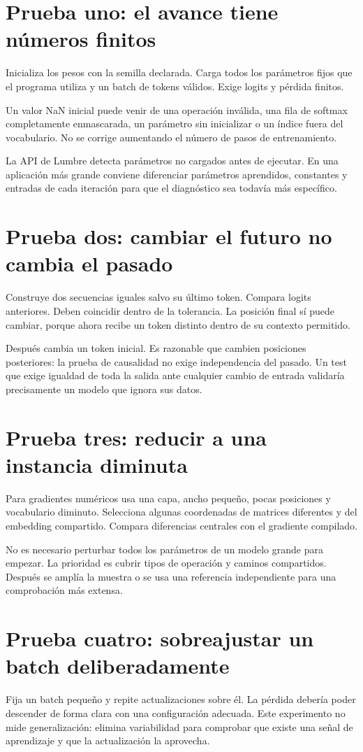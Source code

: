 \documentclass[12pt,a4paper,oneside]{report}
\begin{document}
\section{Prueba uno: el avance tiene números finitos}
Inicializa los pesos con la semilla declarada. Carga todos los parámetros fijos que el programa utiliza y un batch de tokens válidos. Exige logits y pérdida finitos.

Un valor NaN inicial puede venir de una operación inválida, una fila de softmax completamente enmascarada, un parámetro sin inicializar o un índice fuera del vocabulario. No se corrige aumentando el número de pasos de entrenamiento.

La API de Lumbre detecta parámetros no cargados antes de ejecutar. En una aplicación más grande conviene diferenciar parámetros aprendidos, constantes y entradas de cada iteración para que el diagnóstico sea todavía más específico.

\section{Prueba dos: cambiar el futuro no cambia el pasado}
Construye dos secuencias iguales salvo su último token. Compara logits anteriores. Deben coincidir dentro de la tolerancia. La posición final sí puede cambiar, porque ahora recibe un token distinto dentro de su contexto permitido.

Después cambia un token inicial. Es razonable que cambien posiciones posteriores: la prueba de causalidad no exige independencia del pasado. Un test que exige igualdad de toda la salida ante cualquier cambio de entrada validaría precisamente un modelo que ignora sus datos.

\section{Prueba tres: reducir a una instancia diminuta}
Para gradientes numéricos usa una capa, ancho pequeño, pocas posiciones y vocabulario diminuto. Selecciona algunas coordenadas de matrices diferentes y del embedding compartido. Compara diferencias centrales con el gradiente compilado.

No es necesario perturbar todos los parámetros de un modelo grande para empezar. La prioridad es cubrir tipos de operación y caminos compartidos. Después se amplía la muestra o se usa una referencia independiente para una comprobación más extensa.

\section{Prueba cuatro: sobreajustar un batch deliberadamente}
Fija un batch pequeño y repite actualizaciones sobre él. La pérdida debería poder descender de forma clara con una configuración adecuada. Este experimento no mide generalización: elimina variabilidad para comprobar que existe una señal de aprendizaje y que la actualización la aprovecha.
\end{document}
